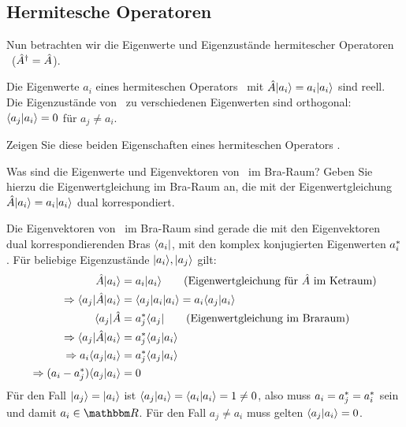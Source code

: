 \subsection{Hermitesche Operatoren}
Nun betrachten wir die Eigenwerte und Eigenzust\"ande hermitescher Operatoren \opa\ (${\hat{A}}^{\dag} = \hat{A}$).
\begin{eig}
 Die Eigenwerte $a_i$ eines hermiteschen Operators \opa\ mit $\opa \ket{a_i} = a_i \ket{a_i}$ sind reell. Die Eigenzust\"ande von \opa\ zu verschiedenen Eigenwerten sind orthogonal: $\braket{a_j|a_i} = 0$ f\"ur $a_j \neq a_i$.
\end{eig}
\begin{aufg}
 Zeigen Sie diese beiden Eigenschaften eines hermiteschen Operators \opa.
\end{aufg}
\begin{tipp}
 Was sind die Eigenwerte und Eigenvektoren von \opa\ im Bra-Raum? Geben Sie hierzu die Eigenwertgleichung im Bra-Raum an, die mit der Eigenwertgleichung $\opa \ket{a_i} = a_i \ket{a_i} $ dual korrespondiert.
\end{tipp}
\begin{loes}
 Die Eigenvektoren von \opa\ im Bra-Raum sind gerade die mit den Eigenvektoren dual korrespondierenden Bras $\bra{a_i}$, mit den komplex konjugierten Eigenwerten $a_i^*$. F\"ur beliebige Eigenzust\"ande $\ket{a_i}, \ket{a_j}$ gilt:
 \begin{align}
 \opa \ket{a_i} &= a_i\ket{a_i} \tag{Eigenwertgleichung f\"ur \opa\ im Ketraum} \\
 \Rightarrow \braket{a_j | \opa | a_i} &= \braket{a_j | a_i | a_i} = a_i \braket{a_j|a_i} \\
 \bra{a_j} \opa &= \cc{a_j} \bra{a_j} \tag{Eigenwertgleichung im Braraum} \\
 \Rightarrow \braket{a_j | \opa | a_i} &= \cc{a_j} \braket{a_j|a_i} \\
 \Rightarrow a_i \braket{a_j | a_i} &= \cc{a_j} \braket{a_j | a_i} \\
 \Rightarrow (a_i - \cc{a_j}) \braket{a_j | a_i} &= 0
 \end{align}
 F\"ur den Fall $\ket{a_j} = \ket{a_i}$ ist $\braket{a_j | a_i} = \braket{a_i | a_i} = 1 \neq 0$, also muss $a_i = a_j^* = a_i^*$ sein und damit $a_i \in \reals$. F\"ur den Fall $a_j \neq a_i$ muss gelten $\braket{a_j | a_i} = 0$. \qedsymbol
\end{loes}

